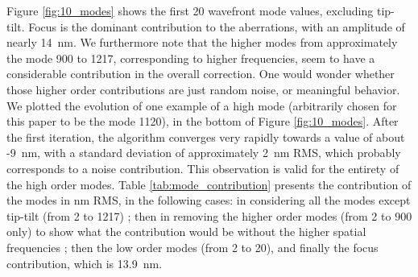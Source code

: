 \documentclass[twocolumn]{aa}
\begin{document}
Figure \ref{fig:10_modes} shows the first 20 wavefront mode values, excluding tip-tilt. Focus is the dominant contribution to the aberrations, with an amplitude of nearly 14~nm. We furthermore note that the higher modes from approximately the mode 900 to 1217, corresponding to higher frequencies, seem to have a considerable contribution in the overall correction. One would wonder whether those higher order contributions are just random noise, or meaningful behavior. We plotted the evolution of one example of a high mode (arbitrarily chosen for this paper to be the mode 1120), in the bottom of Figure \ref{fig:10_modes}. After the first iteration, the algorithm converges very rapidly towards a value of about -9~nm, with a standard deviation of approximately 2~nm RMS, which probably corresponds to a noise contribution. This observation is valid for the entirety of the high order modes. Table \ref{tab:mode_contribution} presents the contribution of the modes in nm RMS, in the following cases: in considering all the modes except tip-tilt (from 2 to 1217) ; then in removing the higher order modes (from 2 to 900 only) to show what the contribution would be without the higher spatial frequencies ; then the low order modes (from 2 to 20), and finally the focus contribution, which is  13.9~nm. 
\end{document}
